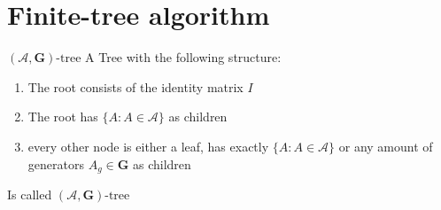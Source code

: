 
\chapter{Finite-tree algorithm}
\label{ch:finite-tree}

\begin{definition}{$(\mathcal{A},\mathbf{G})\text{-tree}$}
A Tree with the following structure: 
\begin{enumerate}
    \item The root consists of the identity matrix $I$
    \item The root has $\{A: A \in \mathcal{A}\}$ as children
    \item every other node is either a leaf, has exactly $\{A: A \in \mathcal{A}\}$ or any amount of generators $A_g \in \mathbf{G}$ as children
\end{enumerate}
Is called $(\mathcal{A},\mathbf{G})\text{-tree}$
\end{definition}